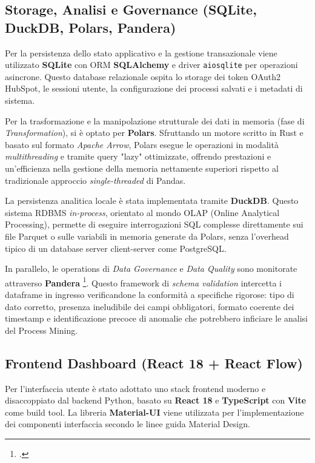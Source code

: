 \documentclass[12pt, a4paper]{report}
\begin{document}
\subsection{Storage, Analisi e Governance (SQLite, DuckDB, Polars, Pandera)}
Per la persistenza dello stato applicativo e la gestione transazionale viene utilizzato \textbf{SQLite} con ORM \textbf{SQLAlchemy} e driver \texttt{aiosqlite} per operazioni asincrone. Questo database relazionale ospita lo storage dei token OAuth2 HubSpot, le sessioni utente, la configurazione dei processi salvati e i metadati di sistema.

Per la trasformazione e la manipolazione strutturale dei dati in memoria (fase di \textit{Transformation}), si è optato per \textbf{Polars}. Sfruttando un motore scritto in Rust e basato sul formato \textit{Apache Arrow}, Polars esegue le operazioni in modalità \textit{multithreading} e tramite query "lazy" ottimizzate, offrendo prestazioni e un'efficienza nella gestione della memoria nettamente superiori rispetto al tradizionale approccio \textit{single-threaded} di Pandas.

La persistenza analitica locale è stata implementata tramite \textbf{DuckDB}. Questo sistema RDBMS \textit{in-process}, orientato al mondo OLAP (Online Analytical Processing), permette di eseguire interrogazioni SQL complesse direttamente sui file Parquet o sulle variabili in memoria generate da Polars, senza l'overhead tipico di un database server client-server come PostgreSQL.

In parallelo, le operations di \textit{Data Governance} e \textit{Data Quality} sono monitorate attraverso \textbf{Pandera} \footcite{bantilan2020}. Questo framework di \textit{schema validation} intercetta i dataframe in ingresso verificandone la conformità a specifiche rigorose: tipo di dato corretto, presenza ineludibile dei campi obbligatori, formato coerente dei timestamp e identificazione precoce di anomalie che potrebbero inficiare le analisi del Process Mining.

\subsection{Frontend Dashboard (React 18 + React Flow)}
Per l'interfaccia utente è stato adottato uno stack frontend moderno e disaccoppiato dal backend Python, basato su \textbf{React 18} e \textbf{TypeScript} con \textbf{Vite} come build tool. La libreria \textbf{Material-UI} viene utilizzata per l'implementazione dei componenti interfaccia secondo le linee guida Material Design.
\end{document}

